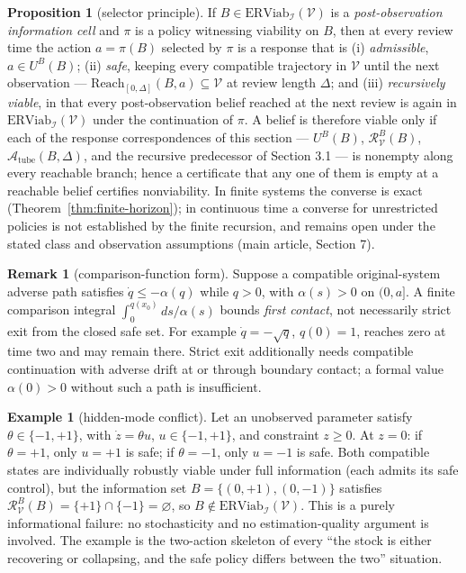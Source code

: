 \documentclass[11pt]{article}
\theoremstyle{definition}
\newtheorem{proposition}{Proposition}
\newtheorem{remark}{Remark}
\newtheorem{example}{Example}
\begin{document}
\begin{proposition}[selector principle]\label{prop:selector}
If \(B\in\mathrm{ERViab}_{\mathcal{I}}(\mathcal{V})\) is a \emph{post-observation information cell} and \(\pi\) is a
policy witnessing viability on \(B\), then at every review time the
action \(a=\pi(B)\) selected by \(\pi\) is a response that is
(i) \emph{admissible}, \(a\in U^B(B)\); (ii) \emph{safe}, keeping every
compatible trajectory in \(\mathcal{V}\) until the next observation ---
\(\mathrm{Reach}_{[0,\Delta]}(B,a)\subseteq\mathcal{V}\) at review
length \(\Delta\); and (iii) \emph{recursively viable}, in that every
post-observation belief reached at the next review is again in
\(\mathrm{ERViab}_{\mathcal{I}}(\mathcal{V})\) under the continuation
of \(\pi\). A belief is therefore viable only if each of the response
correspondences of this section --- \(U^B(B)\),
\(\mathcal{R}_{\mathcal{V}}^B(B)\), \(\mathcal{A}_{\mathrm{tube}}(B,\Delta)\),
and the recursive predecessor of Section 3.1 --- is nonempty along
every reachable branch; hence a certificate that any one of them is
empty at a reachable belief certifies nonviability. In finite systems
the converse is exact (Theorem~\ref{thm:finite-horizon}); in continuous time a converse for unrestricted policies is not established by the finite recursion, and remains open under the stated class and observation assumptions (main article, Section 7).
\end{proposition}

\begin{remark}[comparison-function form]\label{rem:comparison}
Suppose a compatible original-system adverse path satisfies \(\dot q\le-\alpha(q)\) while \(q>0\), with \(\alpha(s)>0\) on \((0,a]\). A finite comparison integral \(\int_0^{q(x_0)}ds/\alpha(s)\) bounds \emph{first contact}, not necessarily strict exit from the closed safe set. For example \(\dot q=-\sqrt q\), \(q(0)=1\), reaches zero at time two and may remain there. Strict exit additionally needs compatible continuation with adverse drift at or through boundary contact; a formal value \(\alpha(0)>0\) without such a path is insufficient.
\end{remark}

\begin{example}[hidden-mode conflict]\label{ex:hidden-mode} Let an unobserved parameter satisfy
\(\theta \in \{-1, +1\}\), with \(\dot z = \theta u\),
\(u \in \{-1, +1\}\), and constraint \(z \ge 0\). At \(z = 0\): if
\(\theta = +1\), only \(u = +1\) is safe; if \(\theta = -1\), only
\(u = -1\) is safe. Both compatible states are individually robustly
viable under full information (each admits its safe control), but the
information set \(B = \{(0, +1), (0, -1)\}\) satisfies
\(\mathcal{R}_{\mathcal{V}}^B(B) = \{+1\} \cap \{-1\} = \varnothing\),
so \(B \notin \mathrm{ERViab}_{\mathcal{I}}(\mathcal{V})\). This is a
purely informational failure: no stochasticity and no estimation-quality
argument is involved. The example is the two-action skeleton of every
``the stock is either recovering or collapsing, and the safe policy
differs between the two'' situation.

\end{example}
\end{document}
